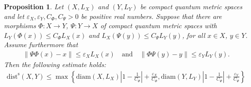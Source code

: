 \documentclass{amsart}
\theoremstyle{plain}
\newtheorem{proposition}[theorem]{Proposition}
\theoremstyle{definition}
\theoremstyle{remark}
\begin{document}
	\begin{proposition}\label{prop:Criterion-qGH-comparison}
		Let $(X,L_X)$ and $(Y,L_Y)$ be compact quantum metric spaces and let $\varepsilon_X, \varepsilon_Y, C_\Phi, C_\Psi > 0$ be positive real numbers.
		Suppose that there are morphisms $\Phi : X \rightarrow Y$, $\Psi : Y \rightarrow X$ of compact quantum metric spaces with $L_Y(\Phi(x)) \leq C_\Phi L_X(x)$ and $L_X(\Psi(y)) \leq C_\Psi L_Y(y)$, for all $x \in X$, $y \in Y$.
		Assume furthermore that
		\begin{align}
			\lVert\Psi\Phi(x)-x\rVert \leq \varepsilon_X L_X(x) \quad \text{and} \quad
			\lVert\Phi\Psi(y)-y\rVert \leq \varepsilon_Y L_Y(y).
		\end{align}
		Then the following estimate holds:
		\begin{align}
			\mathrm{dist}^\mathrm{s}(X,Y) 
			\leq \max\left\{\mathrm{diam}(X,L_X) \left| 1-\frac{1}{C_\Phi}\right| + \frac{\varepsilon_X}{C_\Phi}, \mathrm{diam}(Y,L_Y) \left| 1-\frac{1}{C_\Psi}\right| + \frac{\varepsilon_Y}{C_\Psi}\right\}
		\end{align}
	\end{proposition}
	
\end{document}
